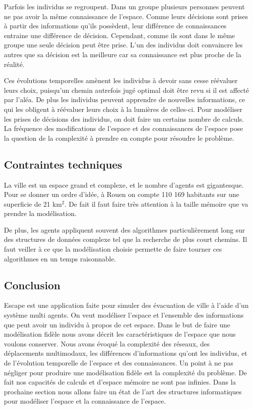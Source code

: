 \documentclass[a4paper]{article}
\begin{document}
Parfois les individus se regroupent. Dans un groupe plusieurs personnes peuvent
ne pas avoir la même connaissance de l'espace. Comme leurs décisions sont prises
à partir des informations qu'ils possèdent, leur différence de connaissances
entraine une différence de décision. Cependant, comme ils sont dans le même
groupe une seule décision peut être prise. L'un des individus doit convaincre
les autres que sa décision est la meilleure car sa connaissance est plus proche
de la réalité.

Ces évolutions temporelles amènent les individus à devoir sans cesse réévaluer
leurs choix, puisqu'un chemin autrefois jugé optimal doit être revu si il est
affecté par l'aléa. De plus les individus peuvent apprendre de nouvelles
informations, ce qui les obligent à réévaluer leurs choix à la lumières de
celles-ci. Pour modéliser les prises de décisions des individus, on doit faire
un certains nombre de calculs. La fréquence des modifications de l'espace et des
connaissances de l'espace pose la question de la complexité à prendre en compte
pour résoudre le problème.

\subsection{Contraintes techniques}

La ville est un espace grand et complexe, et le nombre d'agents est gigantesque.
Pour se donner un ordre d'idée, à Rouen on compte 110 169 habitants sur une
superficie de 21 km$^2$. De fait il faut faire très attention à la taille
mémoire que va prendre la modélisation.

De plus, les agents appliquent souvent des algorithmes particulièrement long sur
des structures de données complexe tel que la recherche de plus court chemins.
Il faut veiller à ce que la modélisation choisie permette de faire tourner ces
algorithmes en un temps raisonnable.

\subsection{Conclusion}

Escape est une application faite pour simuler des évacuation de ville à l'aide
d'un système multi agents. On veut modéliser l'espace et l'ensemble des
informations que peut avoir un individu à propos de cet espace. Dans le but de
faire une modélisation fidèle nous avons décrit les caractéristiques de l'espace
que nous voulons conserver. Nous avons évoqué la complexité des réseaux, des
déplacements multimodaux, les différences d'informations qu'ont les individus,
et de l'évolution temporelle de l'espace et des connaissances. Un point à ne pas
négliger pour produire une modélisation fidèle est la complexité du problème. De
fait nos capacités de calculs et d'espace mémoire ne sont pas infinies. Dans la
prochaine section nous allons faire un état de l'art des structures
informatiques pour modéliser l'espace et la connaissance de l'espace.
\end{document}
